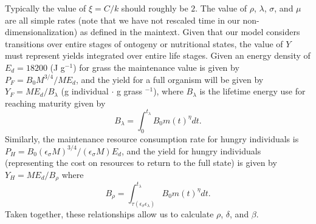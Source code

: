 \documentclass[twocolumn,preprintnumbers,amsmath,amssymb,superscriptaddress]{revtex4}
\begin{document}

Typically the value of $\xi=C/k$ should roughly be $2$. The value of $\rho$, $\lambda$, $\sigma$, and $\mu$ are all simple rates (note that we have not rescaled time in our non-dimensionalization) as defined in the maintext. Given that our model considers transitions over entire stages of ontogeny or nutritional states, the value of $Y$ must represent yields integrated over entire life stages. Given an energy density of $E_{d}=18200$ (J g$^{-1}$) for grass \citep{estermann} the maintenance value is given by $P_{F}=B_{0}M^{3/4}/ME_{d}$, and the yield for a full organism will be given by $Y_{F}=ME_{d}/B_{\lambda}$ (g individual $\cdot$ g grass $^{-1}$), where $B_{\lambda}$ is the lifetime energy use for reaching maturity given by
\begin{equation}
B_{\lambda}=\int_{0}^{t_{\lambda}}B_{0}m\left(t\right)^{\eta}dt.
\end{equation}
Similarly, the maintenance resource consumption rate for hungry individuals is $P_{H}=B_{0}(\epsilon_{\sigma}M)^{3/4}/(\epsilon_{\sigma}M)E_{d}$, and the yield for hungry individuals (representing the cost on resources to return to the full state) is given by $Y_{H}=ME_{d}/B_{\rho}$ where
\begin{equation}
B_{\rho}=\int_{\tau\left(\epsilon_{\sigma}\epsilon_{\lambda}\right)}^{t_{\lambda}}B_{0}m\left(t\right)^{\eta}dt.
\end{equation}
Taken together, these relationships allow us to calculate $\rho$, $\delta$, and $\beta$.
\end{document}
